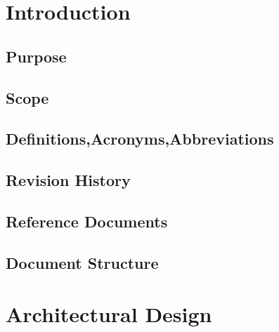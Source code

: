 \documentclass[a4paper]{report}
\begin{document}
\tableofcontents
\listoffigures
\begingroup
\let\clearpage\relax %
\listoftables
\endgroup
\restoregeometry

\chapter{Introduction}
\section{Purpose}
\section{Scope}
\section{Definitions,Acronyms,Abbreviations}
\section{Revision History}
\section{Reference Documents}
\section{Document Structure}

\chapter{Architectural Design}
\end{document}
